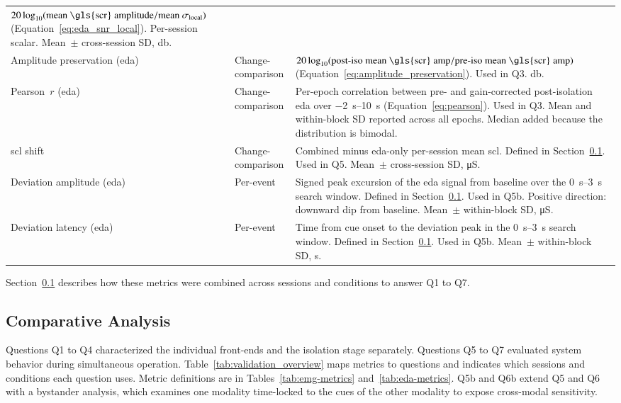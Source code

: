 {\begin{xltabular}{\widetable}{>{\raggedright\arraybackslash}p{3.6cm} l >{\raggedright\arraybackslash}X}
$20\log_{10}(\text{mean \gls{scr} amplitude} / \text{mean }\sigma_\text{local})$ (Equation~\ref{eq:eda_snr_local}). Per-session scalar. Mean~$\pm$ cross-session SD, \si{\decibel}. \\
\addlinespace
Amplitude preservation (\gls{eda}) & Change-comparison &
$20\log_{10}(\text{post-iso mean \gls{scr} amp} / \text{pre-iso mean \gls{scr} amp})$ (Equation~\ref{eq:amplitude_preservation}). Used in Q3. \si{\decibel}. \\
\addlinespace
Pearson~$r$ (\gls{eda}) & Change-comparison &
Per-epoch correlation between pre- and gain-corrected post-isolation \gls{eda} over \SIrange{-2}{10}{\second} (Equation~\ref{eq:pearson}). Used in Q3. Mean and within-block SD reported across all epochs. Median added because the distribution is bimodal. \\
\addlinespace
\gls{scl} shift & Change-comparison &
Combined minus \gls{eda}-only per-session mean \gls{scl}. Defined in Section~\ref{sec:comparative_analysis}. Used in Q5. Mean~$\pm$ cross-session SD, \si{\micro\siemens}. \\
\addlinespace
Deviation amplitude (\gls{eda}) & Per-event &
Signed peak excursion of the \gls{eda} signal from baseline over the \SIrange{0}{3}{\second} search window. Defined in Section~\ref{sec:comparative_analysis}. Used in Q5b. Positive direction: downward dip from baseline. Mean~$\pm$ within-block SD, \si{\micro\siemens}. \\
\addlinespace
Deviation latency (\gls{eda}) & Per-event &
Time from cue onset to the deviation peak in the \SIrange{0}{3}{\second} search window. Defined in Section~\ref{sec:comparative_analysis}. Used in Q5b. Mean~$\pm$ within-block SD, \si{\second}. \\
\end{xltabular}
}

Section~\ref{sec:comparative_analysis} describes how these metrics were combined across sessions and conditions to answer Q1 to Q7.

\FloatBarrier

\subsection{Comparative Analysis}
\label{sec:comparative_analysis}
Questions Q1 to Q4 characterized the individual front-ends and the isolation stage separately. Questions Q5 to Q7 evaluated system behavior during simultaneous operation. Table~\ref{tab:validation_overview} maps metrics to questions and indicates which sessions and conditions each question uses. Metric definitions are in Tables~\ref{tab:emg-metrics} and~\ref{tab:eda-metrics}. Q5b and Q6b extend Q5 and Q6 with a bystander analysis, which examines one modality time-locked to the cues of the other modality to expose cross-modal sensitivity.

